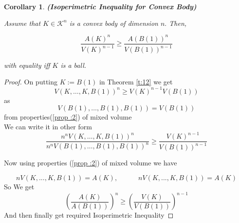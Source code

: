\documentclass[oneside]{book}
\newtheorem{corollary}{Corollary}[theorem]
\begin{document}
	\hfill \break
	
	
	
	
	
	
	
	
	
	
	
	
	\begin{corollary}\textbf{(Isoperimetric Inequality for Convex Body)}       
		
		
		Assume that $K \in \mathcal{K}^{n}$ is a convex body of dimension $n .$ Then,
		
		$$\frac{{A(K)}^n}{{V(K)}^{n-1}} \geq \frac{{A(B(1))}^{n}}{{V(B(1))}^{n-1}} $$
		
		with equality  iff  $K$ is a ball.
		
	\end{corollary}
	\begin{proof}
		
		
		On putting $K:=B(1)$ in Theorem \ref{t:12} we get 
		\[
		V(K, \ldots, K, B(1))^{n} \geq V(K)^{n-1} V(B(1))
		\]
		as $$V(B(1), \ldots, B(1), B(1)) = V(B(1))$$ from properties(\ref{prop :2}) of mixed volume \\
		
		We can write it in other form
		\[
		\frac{n^{n} V(K, \ldots, K, B(1))^{n}}{n^{n} V(B(1), \ldots, B(1), B(1))^{n}} \geq \frac{V(K)^{n-1}}{V(B(1))^{n-1}}
		\]
		
		Now using  properties (\ref{prop :2}) of mixed volume we have
		
		$$ nV(K, ..., K, B(1)) = A(K),\quad  \quad \quad nV(K, ..., K, B(1)) = A(K) $$ 
		So
		We get \[
		\left(\frac{A(K)}{A(B(1))}\right)^{n} \geq\left(\frac{V(K)}{V(B(1))}\right)^{n-1}
		\]
		And then finally get required Isoperimetric Inequality
	\end{proof}
	
\end{document}
